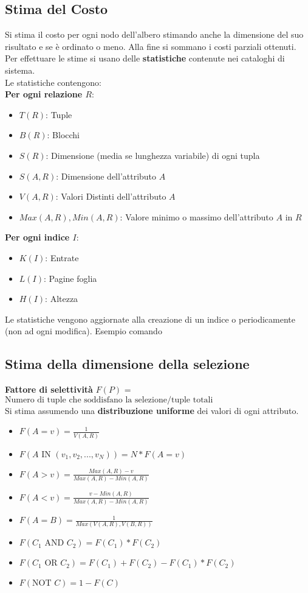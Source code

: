 \subsection{Stima del Costo}
Si stima il costo per ogni nodo dell'albero stimando anche la dimensione del suo risultato e se \`e ordinato o meno. Alla fine si sommano i costi parziali ottenuti.\\
Per effettuare le stime si usano delle \textbf{statistiche} contenute nei cataloghi di sistema.\\
Le statistiche contengono:\\
\textbf{Per ogni relazione $R$}:
\begin{itemize}
    \item $T(R)$: Tuple
    \item $B(R)$: Blocchi
    \item $S(R)$: Dimensione (media se lunghezza variabile) di ogni tupla
    \item $S(A, R)$: Dimensione dell'attributo $A$
    \item $V(A, R)$: Valori Distinti dell'attributo $A$
    \item $Max(A, R), Min(A, R)$: Valore minimo o massimo dell'attributo $A$ in $R$
\end{itemize}
\textbf{Per ogni indice $I$}:
\begin{itemize}
    \item $K(I)$: Entrate
    \item $L(I)$: Pagine foglia
    \item $H(I)$: Altezza
\end{itemize}
Le statistiche vengono aggiornate alla creazione di un indice o periodicamente (non ad ogni modifica). Esempio comando 

\subsection{Stima della dimensione della selezione}
\textbf{Fattore di selettività} $F(P)$ = $\text{Numero di tuple che soddisfano la selezione}/\text{tuple totali}$\\
Si stima assumendo una \textbf{distribuzione uniforme} dei valori di ogni attributo.
\begin{itemize}
    \item $F(A=v) = \frac{1}{V(A, R)}$
    \item $F(A \text{ IN } (v_1, v_2, ..., v_N)) = N * F(A = v)$
    \item $F(A > v) = \frac{Max(A, R) - v}{Max(A, R) - Min(A, R)}$
    \item $F(A < v) = \frac{v - Min(A, R)}{Max(A, R) - Min(A, R)}$
    \item $F(A = B) = \frac{1}{Max(V(A, R), V(B, R))}$
    \item $F(C_1 \text{ AND } C_2) = F(C_1) * F(C_2)$
    \item $F(C_1 \text{ OR } C_2) = F(C_1) + F(C_2) - F(C_1) * F(C_2)$
    \item $F(\text{NOT }C) = 1 - F(C)$
\end{itemize}

